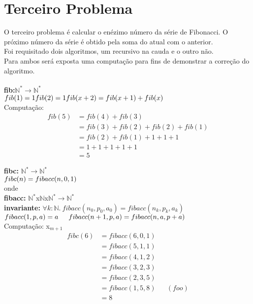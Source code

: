 \documentclass{article}
\begin{document}
\section{Terceiro Problema}
O terceiro problema é calcular o enézimo número da série de Fibonacci. O próximo número da série é obtido pela soma do atual com o anterior.\\
Foi requisitado dois algoritmos, um recursivo na cauda e o outro não.\\
Para ambos será exposta uma computação para fins de demonstrar a correção do algoritmo.\\
\\
\textbf{fib:}$\mathbb{N}^* \rightarrow \mathbb{N}^*$\\
$fib(1) = 1\\
fib(2) = 1\\
fib(x+2) = fib(x+1) + fib(x)\\$
\\
Computação:
\begin{align*}
fib(5) &= fib(4) + fib(3)\\
&= fib(3) + fib(2) + fib(2) + fib(1)\\
&= fib(2) + fib(1) + 1 + 1 + 1\\
&= 1 + 1 + 1 + 1 + 1\\
&= 5
\end{align*}

\noindent\textbf{fibc:} $\mathbb{N}^* \rightarrow \mathbb{N}^*$\\
$fibc(n) = fibacc(n, 0, 1)\\$
\\
onde\\
\indent \textbf{fibacc:} $\mathbb{N}^*$x$\mathbb{N}$x$\mathbb{N}^* \rightarrow \mathbb{N}^*$\\
\indent \textbf{invariante:} $\forall k:\mathbb{N}.\: fibacc(n_0, p_0, a_0) = fibacc(n_k, p_k, a_k)$\\
\indent $fibacc(1, p, a) = a\\
\indent fibacc(n+1, p, a) = fibacc(n, a, p+a)\\$
\\
Computação:
x$_{m+1}$
\begin{align*}
fibc(6) &= fibacc(6, 0, 1)\\
&= fibacc(5, 1, 1)\\
&= fibacc(4, 1, 2)\\
&= fibacc(3, 2, 3)\\
&= fibacc(2, 3, 5)\\
&= fibacc(1, 5, 8) && (foo)\\
&= 8
\end{align*}
\end{document}
